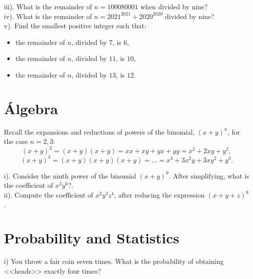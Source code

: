 
iii). What is the remainder of $n=100080001$ when divided by nine?\\


iv). What is the remainder of $n=2021^{2021}+2020^{2020}$ divided by nine?\\


v). Find the smallest positive integer such that:
\begin{itemize}
\item the remainder of $n$, divided by $7$, is $6$,
\item the remainder of $n$, divided by $11$, is $10$,
\item the remainder of $n$, divided by $13$, is $12$.
\end{itemize}



\section*{Álgebra}

Recall the expansions and reductions of powers of the binomial, $(x+y)^n$, for the case $n=2,3$:
$$(x+y)^2=(x+y)(x+y)=xx+xy+yx+yy= x^2+2xy+y^2,$$
$$(x+y)^3=(x+y)(x+y)(x+y)=\dots = x^3+3x^2y+3xy^2+y^3.$$

i). Consider the ninth power of the binomial $(x+y)^{9}$. After simplifying, what is the coefficient of $x^3y^6$?.\\

ii). Compute the coefficient of $x^2y^3z^4$, after reducing the expression $(x+y+z)^{9}$.


\section*{Probability and Statistics}

i) You throw a fair coin seven times. What is the probability of obtaining <<heads>> exactly four times?\\

